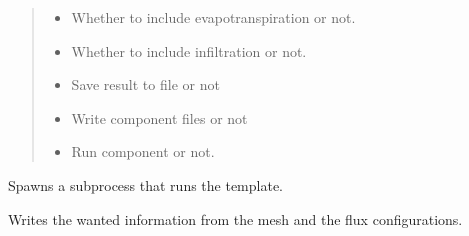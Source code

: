 \documentclass[letterpaper,10pt,english]{sphinxmanual}
\begin{document}
\begin{fulllineitems}
\begin{fulllineitems}
\begin{quote}
\begin{description}
\begin{itemize}
\item {} 
 \textendash{} Whether to include evapotranspiration or not.

\item {} 
 \textendash{} Whether to include infiltration or not.

\item {} 
 \textendash{} Save result to file or not

\item {} 
 \textendash{} Write component files or not

\item {} 
 \textendash{} Run component or not.

\end{itemize}

\end{description}\end{quote}

\end{fulllineitems}


\begin{fulllineitems}
\label{\detokenize{cmf:livestock.components.comp_cmf.CMFSurfaceFluxResult.run_template}}
Spawns a subprocess that runs the template.

\end{fulllineitems}


\begin{fulllineitems}
\label{\detokenize{cmf:livestock.components.comp_cmf.CMFSurfaceFluxResult.write}}
Writes the wanted information from the mesh and the flux configurations.

\end{fulllineitems}


\end{fulllineitems}

\end{document}

